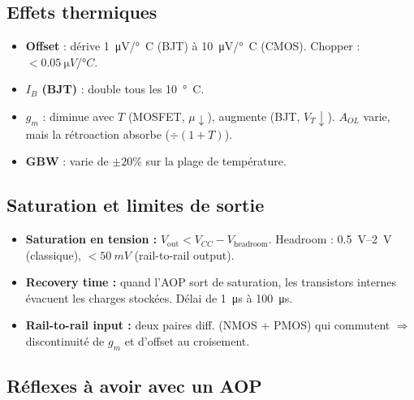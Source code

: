 \documentclass[12pt,a4paper,twoside]{book}
\begin{document}
\subsection{Effets thermiques}

\begin{formule}
\begin{itemize}[nosep]
\item \textbf{Offset} : dérive \SI{1}{\micro V/°C} (BJT) à \SI{10}{\micro V/°C} (CMOS). Chopper : $< \SI{0.05}{\micro V/°C}$.
\item \textbf{$I_B$ (BJT)} : double tous les \SI{10}{°C}.
\item \textbf{$g_m$} : diminue avec $T$ (MOSFET, $\mu \downarrow$), augmente (BJT, $V_T \downarrow$). $A_{OL}$ varie, mais la rétroaction absorbe ($\div(1+T)$).
\item \textbf{GBW} : varie de $\pm 20\%$ sur la plage de température.
\end{itemize}
\end{formule}

\subsection{Saturation et limites de sortie}

\begin{formule}
\begin{itemize}[nosep]
\item \textbf{Saturation en tension :} $V_{\text{out}} < V_{CC} - V_{\text{headroom}}$. Headroom : \SI{0.5}{V}--\SI{2}{V} (classique), $< \SI{50}{mV}$ (rail-to-rail output).
\item \textbf{Recovery time :} quand l'AOP sort de saturation, les transistors internes évacuent les charges stockées. Délai de \SI{1}{\micro s} à \SI{100}{\micro s}.
\item \textbf{Rail-to-rail input :} deux paires diff. (NMOS + PMOS) qui commutent $\Rightarrow$ discontinuité de $g_m$ et d'offset au croisement.
\end{itemize}
\end{formule}

\subsection{Réflexes à avoir avec un AOP}
\end{document}
